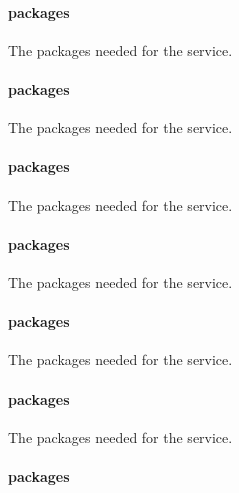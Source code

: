 \paragraph{packages}


The packages needed for the  service.

\paragraph{packages}


The packages needed for the  service.

\paragraph{packages}


The packages needed for the  service.

\paragraph{packages}


The packages needed for the  service.

\paragraph{packages}


The packages needed for the  service.

\paragraph{packages}


The packages needed for the  service.

\paragraph{packages}

